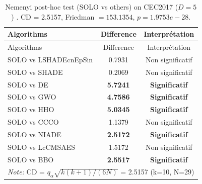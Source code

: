 \begin{center}
\small
\renewcommand{\arraystretch}{1.25}
\begin{longtable}{lcc}
\caption{Nemenyi post-hoc test (SOLO vs others) on CEC2017 ($D=5$) . CD = 2.5157, Friedman $=153.1354$, $p=1.9753e-28$.}
\label{tab:nemenyi_CEC2017_5} \\
\toprule
Algorithms & Difference & Interprétation \\
\midrule
\endfirsthead
\toprule
Algorithms & Difference & Interprétation \\
\midrule
\endhead
SOLO vs LSHADEcnEpSin & 0.7931 & Non significatif \\
SOLO vs SHADE & 0.2069 & Non significatif \\
SOLO vs DE & \textbf{5.7241} & \textbf{Significatif} \\
SOLO vs GWO & \textbf{4.7586} & \textbf{Significatif} \\
SOLO vs HHO & \textbf{5.0345} & \textbf{Significatif} \\
SOLO vs CCCO & 1.1379 & Non significatif \\
SOLO vs NIADE & \textbf{2.5172} & \textbf{Significatif} \\
SOLO vs LcCMSAES & 1.5172 & Non significatif \\
SOLO vs BBO & \textbf{2.5517} & \textbf{Significatif} \\
\midrule
\multicolumn{3}{l}{\textit*{Note:} CD = $q_\alpha \sqrt{k(k+1)/(6N)}$ = 2.5157 (k=10, N=29)} \\
\bottomrule
\end{longtable}
\end{center}